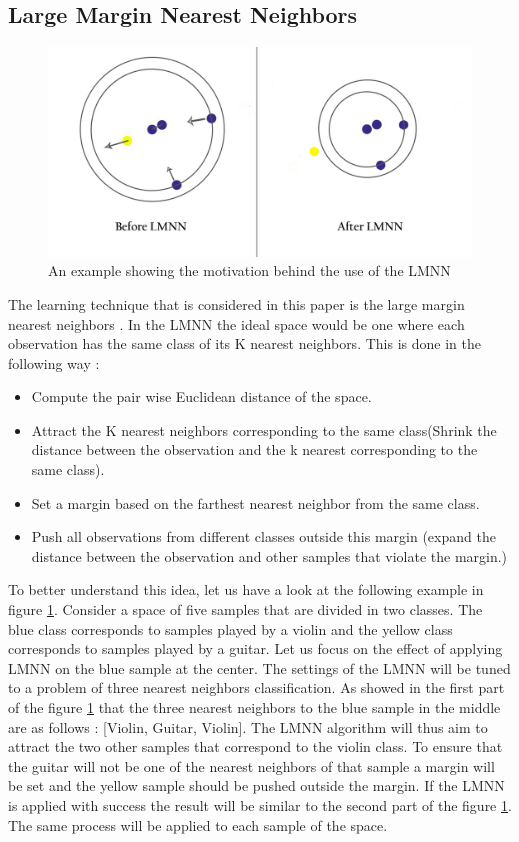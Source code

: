 \documentclass[hidelinks,12pt]{report}
\begin{document}
\subsection{Large Margin Nearest Neighbors}
\begin{figure}[t!]
  
  \centering
	    \includegraphics[width=1\textwidth]{lmnn}
    \caption{An example showing the motivation behind the use of the LMNN}
    \label{LMNN}
\end{figure}
The learning technique that is considered in this paper is the large margin nearest neighbors \cite{W09}. In the LMNN the ideal space would be one where each observation has the same class of its K nearest neighbors. This is done in the following way :
\begin{itemize}
\item Compute the pair wise Euclidean distance of the space.
\item Attract the K nearest neighbors corresponding to the same class(Shrink the distance between the observation and the k nearest corresponding to the same class).
\item Set a margin based on the farthest nearest neighbor from the same class.
\item Push all observations from different classes outside this margin (expand the distance between the observation and other samples that violate the margin.)
\end{itemize}
To better understand this idea, let us have a look at the following example in figure \ref{LMNN}. Consider a space of five samples that are divided in two classes. The blue class corresponds to samples played by a violin and the yellow class corresponds to samples played by a guitar. Let us focus on the effect of applying LMNN on the blue sample at the center. The settings of the LMNN will be tuned to a problem of three nearest neighbors classification. As showed in the first part of the figure \ref{LMNN}  that the three nearest neighbors to the blue sample in the middle are as follows : [Violin, Guitar, Violin]. The LMNN algorithm will thus aim to attract the two other samples that correspond to the violin class. To ensure that the guitar will not be one of the nearest neighbors of that sample a margin will be set and the yellow sample should be pushed outside the margin. If the LMNN is applied with success the result will be similar to the second part of the figure \ref{LMNN}. The same process will be applied to each sample of the space.
\end{document}
